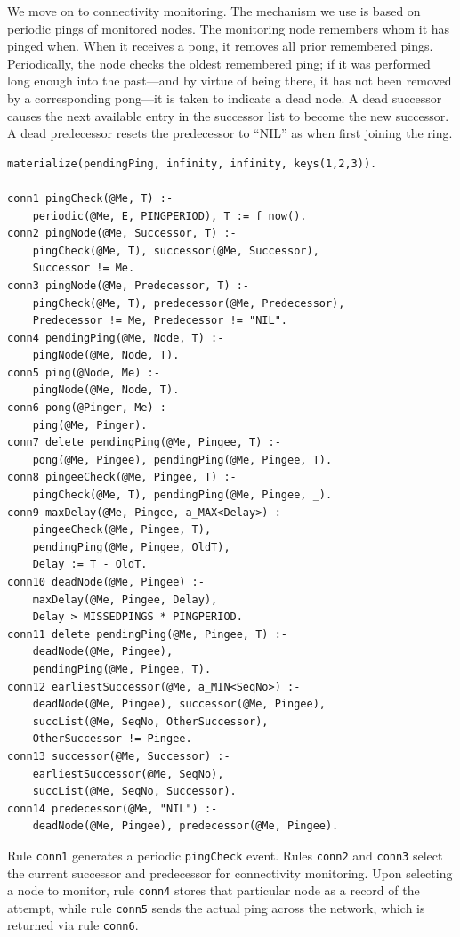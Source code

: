 \documentclass{article}
\begin{document}
We move on to connectivity monitoring. The mechanism we use is based on
periodic pings of monitored nodes.  The monitoring node remembers whom
it has pinged when. When it receives a pong, it removes all prior
remembered pings. Periodically, the node checks the oldest remembered
ping; if it was performed long enough into the past---and by virtue of
being there, it has not been removed by a corresponding pong---it is
taken to indicate a dead node. A dead successor causes the next
available entry in the successor list to become the new successor. A
dead predecessor resets the predecessor to ``NIL'' as when first joining
the ring.

\begin{lstlisting}
materialize(pendingPing, infinity, infinity, keys(1,2,3)).

conn1 pingCheck(@Me, T) :-
	periodic(@Me, E, PINGPERIOD), T := f_now().
conn2 pingNode(@Me, Successor, T) :-
	pingCheck(@Me, T), successor(@Me, Successor),
	Successor != Me.
conn3 pingNode(@Me, Predecessor, T) :-
	pingCheck(@Me, T), predecessor(@Me, Predecessor),
	Predecessor != Me, Predecessor != "NIL".
conn4 pendingPing(@Me, Node, T) :-
	pingNode(@Me, Node, T).
conn5 ping(@Node, Me) :-
	pingNode(@Me, Node, T).
conn6 pong(@Pinger, Me) :-
	ping(@Me, Pinger).
conn7 delete pendingPing(@Me, Pingee, T) :-
	pong(@Me, Pingee), pendingPing(@Me, Pingee, T).
conn8 pingeeCheck(@Me, Pingee, T) :-
	pingCheck(@Me, T), pendingPing(@Me, Pingee, _).
conn9 maxDelay(@Me, Pingee, a_MAX<Delay>) :-
	pingeeCheck(@Me, Pingee, T),
	pendingPing(@Me, Pingee, OldT),
	Delay := T - OldT.
conn10 deadNode(@Me, Pingee) :-
	maxDelay(@Me, Pingee, Delay),
	Delay > MISSEDPINGS * PINGPERIOD.
conn11 delete pendingPing(@Me, Pingee, T) :-
	deadNode(@Me, Pingee),
	pendingPing(@Me, Pingee, T).
conn12 earliestSuccessor(@Me, a_MIN<SeqNo>) :-
	deadNode(@Me, Pingee), successor(@Me, Pingee),
	succList(@Me, SeqNo, OtherSuccessor),
	OtherSuccessor != Pingee.
conn13 successor(@Me, Successor) :-
	earliestSuccessor(@Me, SeqNo),
	succList(@Me, SeqNo, Successor).
conn14 predecessor(@Me, "NIL") :-
	deadNode(@Me, Pingee), predecessor(@Me, Pingee).
\end{lstlisting}

Rule \lstinline$conn1$ generates a periodic \lstinline$pingCheck$
event. Rules \lstinline$conn2$ and \lstinline$conn3$ select the current
successor and predecessor for connectivity monitoring.  Upon selecting a
node to monitor, rule \lstinline$conn4$ stores that particular node as a
record of the attempt, while rule \lstinline$conn5$ sends the actual
ping across the network, which is returned via rule \lstinline$conn6$.
\end{document}
